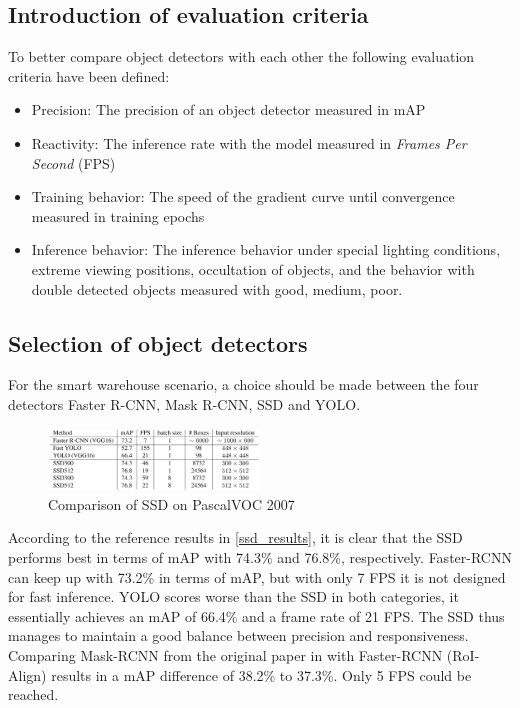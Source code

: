 \documentclass[a4paper, 10pt, journal]{wissarbIEEE}      %
\begin{document}
\subsection{Introduction of evaluation criteria}

To better compare object detectors with each other the following evaluation criteria have been defined:

\begin{itemize}
	\item Precision: The precision of an object detector measured in mAP
	\item Reactivity: The inference rate with the model measured in \textit{Frames Per Second} (FPS)
	\item Training behavior: The speed of the gradient curve until convergence measured in training epochs
	\item Inference behavior: The inference behavior under special lighting conditions, extreme viewing positions, occultation of objects, and the behavior with double detected objects measured with good, medium, poor. 
\end{itemize}

\subsection{Selection of object detectors}

For the smart warehouse scenario, a choice should be made between the four detectors Faster R-CNN, Mask R-CNN, SSD and YOLO. 

\begin{figure}[h]
	\centering
	\includegraphics[width=0.5\textwidth]{fig/ssd_results.png}
	\caption{Comparison of SSD on PascalVOC 2007 \cite{WeiLiuDragomirAnguelovDumitruErhanChristianSzegedyScottReedChengYangFuAlexander.2016}}
	\label{ssd_results}
\end{figure}

According to the reference results in \autoref{ssd_results}, it is clear that the SSD performs best in terms of mAP with 74.3\% and 76.8\%, respectively. Faster-RCNN can keep up with 73.2\% in terms of mAP,
but with only 7 FPS it is not designed for fast inference. YOLO scores worse than the SSD in both categories, it essentially achieves an mAP of 66.4\% and a frame rate of 21 FPS. The SSD thus manages to maintain a good balance between precision and responsiveness. Comparing Mask-RCNN from the original paper in \cite{KaimingHeGeorgiaGkioxariPiotrDollarRossGirshick.2018} with Faster-RCNN (RoI-Align) results in a mAP difference of 38.2\% to 37.3\%. Only 5 FPS could be reached. 
\end{document}
